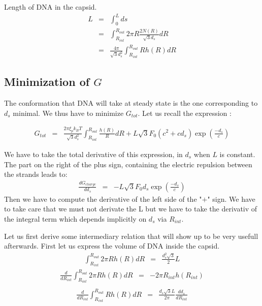 \documentclass{article}
\begin{document}
Length of DNA in the capsid.
\begin{eqnarray}
    L & = & \int_{0}^{L} ds \\
    &=& \int_{R_{int}} ^{R_{out}} 2 \pi R \frac{2 N(R)}{\sqrt{3} d_s} dR \\
    &=& \frac{4 \pi}{\sqrt{3} d_s^2} \int_{R_{int}}^{R_{out}} R h(R) dR
    \label{eq:Ldef}
\end{eqnarray}


\subsection*{Minimization of $G$ \label{sec:Gmin}}

The conformation that DNA will take at steady state is the one corresponding to $d_s$ minimal. We thus have to minimize $G_{tot}$. Let us recall the expression :

\begin{eqnarray*}
    G_{tot} &=& \frac{2\pi \xi_p k_B T}{\sqrt{3} d_s^2} \int_{R_{int}}^{R_{out}} \frac{h(R)}{R} dR + L\sqrt{3} F_0 \left(c^2+cd_s \right) \exp{\left(\frac{-d_s}{c}\right)}
\end{eqnarray*}

We have to take the total derivative of this expression, in $d_s$ when $L$ is constant.
The part on the right of the plus sign, containing the electric repulsion between the strands leads to:
\begin{eqnarray}
    \frac{d G_{charge}}{d d_s} &=& - L \sqrt{3} F_0 d_s \exp{\left(\frac{-d_s}{c}\right)}
    \label{eq:deriv_gcharge}
\end{eqnarray}
Then we have to compute the derivative of the left side of the "$+$" sign. We have to take care that we must not derivate the L but we have to take the derivativ of the integral term which depends implicitly on $d_s$ via $R_{int}$.

Let us first derive some intermediary relation that will show up to be very usefull afterwards.
First let us express the volume of DNA inside the capsid.
\begin{eqnarray}
    \int_{R_{int}}^{R_{out}} 2 \pi R h\left( R \right) dR  &=& \frac{d_s^2 \sqrt{3}}{2} L
    \label{eq:L}
\end{eqnarray}
\begin{eqnarray*}
    \frac{d}{d R_{int}} \int_{R_{int}}^{R_{out}} 2 \pi R h\left( R \right) dR &=& - 2 \pi R_{int} h \left( R_{int} \right) \\
\end{eqnarray*}
\begin{eqnarray}
    \frac{d}{d R_{int}} \int_{R_{int}}^{R_{out}} R h\left( R \right) dR &=& \frac{d_s \sqrt{3} L}{2 \pi} \frac{d d_s}{d R_{int}}
    \label{eq:deriv_1}
\end{eqnarray}
\end{document}
